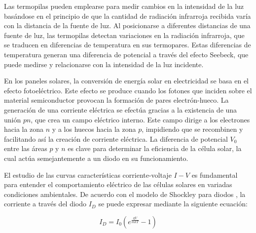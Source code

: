 \vspace{\baselineskip}

Las termopilas pueden emplearse para medir cambios en la intensidad de la luz basándose en el principio de que la cantidad de radiación infrarroja recibida varía con la distancia de la fuente de luz. Al posicionarse a diferentes distancias de una fuente de luz, las termopilas detectan variaciones en la radiación infrarroja, que se traducen en diferencias de temperatura en sus termopares. Estas diferencias de temperatura generan una diferencia de potencial a través del efecto Seebeck, que puede medirse y relacionarse con la intensidad de la luz incidente.

\vspace{\baselineskip}

En los paneles solares, la conversión de energía solar en electricidad se basa en el efecto fotoeléctrico. Este efecto se produce cuando los fotones que inciden sobre el material semiconductor provocan la formación de pares electrón-hueco. La generación de una corriente eléctrica se efectúa gracias a la existencia de una unión $pn$, que crea un campo eléctrico interno. Este campo dirige a los electrones hacia la zona $n$ y a los huecos hacia la zona $p$, impidiendo que se recombinen y facilitando así la creación de corriente eléctrica. La diferencia de potencial $V_0$ entre las áreas $p$ y $n$ es clave para determinar la eficiencia de la célula solar, la cual actúa semejantemente a un diodo en su funcionamiento.

\vspace{\baselineskip}

 


\vspace{\baselineskip}


El estudio de las curvas características corriente-voltaje \(I-V\) es fundamental para entender el comportamiento eléctrico de las células solares en variadas condiciones ambientales. De acuerdo con el modelo de Shockley para diodos \cite{boylestad_nashelsky}, la corriente a través del diodo \(I_D\) se puede expresar mediante la siguiente ecuación:
				
\vspace{\baselineskip}
\begin{equation}\label{eq:Id_shockley}
	I_D = I_0 \left( e^{\textstyle \frac{qV}{m k T}} - 1 \right)
\end{equation}
				
\vspace{\baselineskip}
				
